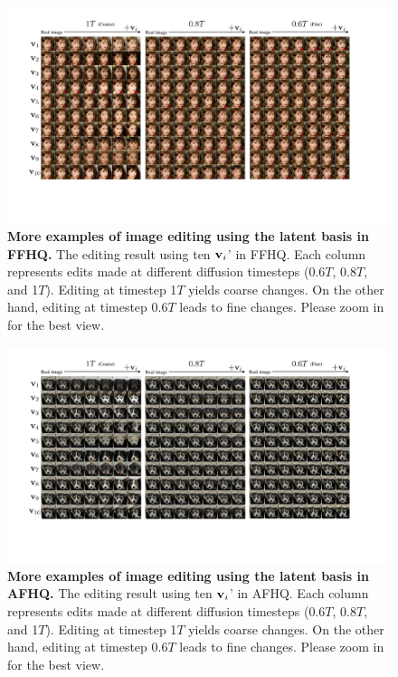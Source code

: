 \begin{figure}[!h]
    \centering
    \includegraphics[width=1.0\linewidth]{figure/ffhq_vis.pdf}
    \vspace{-2em}
    \caption{
    \textbf{More examples of image editing using the latent basis in FFHQ.} The editing result using ten $\mathbf{v}_i$' in FFHQ.  Each column represents edits made at different diffusion timesteps (0.6$T$, 0.8$T$, and 1$T$). Editing at timestep 1$T$ yields coarse changes. On the other hand, editing at timestep 0.6$T$ leads to fine changes. Please zoom in for the best view.}
    \label{fig:ffhq_vis}
\end{figure}

\begin{figure}[!h]
    \centering
    \includegraphics[width=1.0\linewidth]{figure/afhq_vis.pdf}
    \caption{
    \textbf{More examples of image editing using the latent basis in AFHQ.} The editing result using ten $\mathbf{v}_i$' in AFHQ.  Each column represents edits made at different diffusion timesteps (0.6$T$, 0.8$T$, and 1$T$). Editing at timestep 1$T$ yields coarse changes. On the other hand, editing at timestep 0.6$T$ leads to fine changes. Please zoom in for the best view.}
    \label{fig:afhq_vis}
\end{figure}

